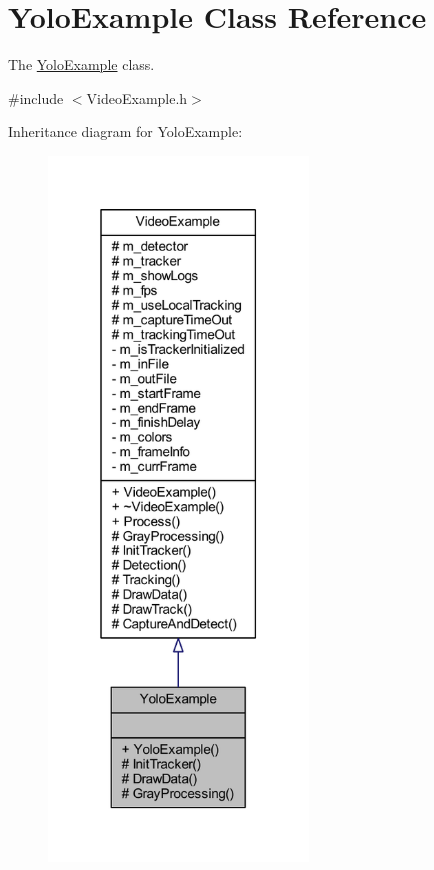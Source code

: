 \hypertarget{class_yolo_example}{}\section{Yolo\+Example Class Reference}
\label{class_yolo_example}


The \mbox{\hyperlink{class_yolo_example}{Yolo\+Example}} class.  




{\ttfamily \#include $<$Video\+Example.\+h$>$}



Inheritance diagram for Yolo\+Example\+:\nopagebreak
\begin{figure}[H]
\begin{center}
\leavevmode
\includegraphics[width=196pt]{class_yolo_example__inherit__graph}
\end{center}
\end{figure}


